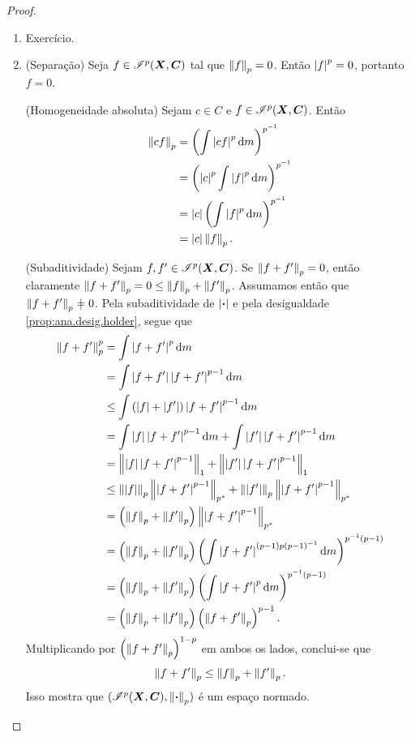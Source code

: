 \begin{proof}
	\begin{enumerate}
	\item Exercício.

	\item (Separação) Seja $f \in \Intg^p(\bm X,\bm C)$ tal que $\nor{f}_p = 0$. Então $\abs{f}^p = 0$, portanto $f=0$.

(Homogeneidade absoluta) Sejam $c \in C$ e $f \in \Intg^p(\bm X,\bm C)$. Então
		\begin{align*}
		\nor{cf}_p &= \left( \int \abs{cf}^p \dd\med \right)^{p\inv} \\
			&= \left( \abs{c}^p \int \abs{f}^p \dd\med \right)^{p\inv} \\
			&= \abs{c} \left( \int \abs{f}^p \dd\med \right)^{p\inv} \\
			&= \abs{c}\nor{f}_p.
		\end{align*}

(Subaditividade) Sejam $f,f' \in \Intg^p(\bm X,\bm C)$. Se $\nor{f+f'}_p = 0$, então claramente $\nor{f+f'}_p = 0 \leq \nor{f}_p + \nor{f'}_p$. Assumamos então que $\nor{f+f'}_p \neq 0$. Pela subaditividade de $\abs{\var}$ e pela desigualdade \ref{prop:ana.desig.holder}, segue que
		\begin{align*}
		\nor{f+f'}_p^p &= \int \abs{f+f'}^p \dd\med \\
			&= \int \abs{f+f'}\abs{f+f'}^{p-1} \dd\med \\
			&\leq \int \left( \abs{f} + \abs{f'} \right) \abs{f+f'}^{p-1} \dd\med \\
			&= \int \abs{f}\abs{f+f'}^{p-1} \dd\med + \int \abs{f'}\abs{f+f'}^{p-1} \dd\med \\
			&= \nor{\abs{f}\abs{f+f'}^{p-1}}_1 + \nor{\abs{f'}\abs{f+f'}^{p-1}}_1 \\
			&\leq \nor{\abs{f}}_p \nor{\abs{f+f'}^{p-1}}_{p\dual} + \nor{\abs{f'}}_p \nor{\abs{f+f'}^{p-1}}_{p\dual} \\
			&= \left( \nor{f}_p + \nor{f'}_p \right) \nor{\abs{f+f'}^{p-1}}_{p\dual} \\
			&= \left( \nor{f}_p + \nor{f'}_p \right) \left( \int \abs{f+f'}^{(p-1) p (p-1)\inv} \dd\med \right)^{p\inv(p-1)} \\
			&= \left( \nor{f}_p + \nor{f'}_p \right) \left( \int \abs{f+f'}^p \dd\med \right)^{p\inv (p-1)} \\
			&= \left( \nor{f}_p + \nor{f'}_p \right) \left( \nor{f+f'}_p \right)^{p-1}.
		\end{align*}
Multiplicando por $\left( \nor{f+f'}_p \right)^{1-p}$ em ambos os lados, conclui-se que
		\begin{equation*}
		\nor{f+f'}_p \leq \nor{f}_p + \nor{f'}_p.
		\end{equation*}
Isso mostra que $(\Intg^p(\bm X,\bm C),\nor{\var}_p)$ é um espaço normado.


\end{enumerate}
\end{proof}
